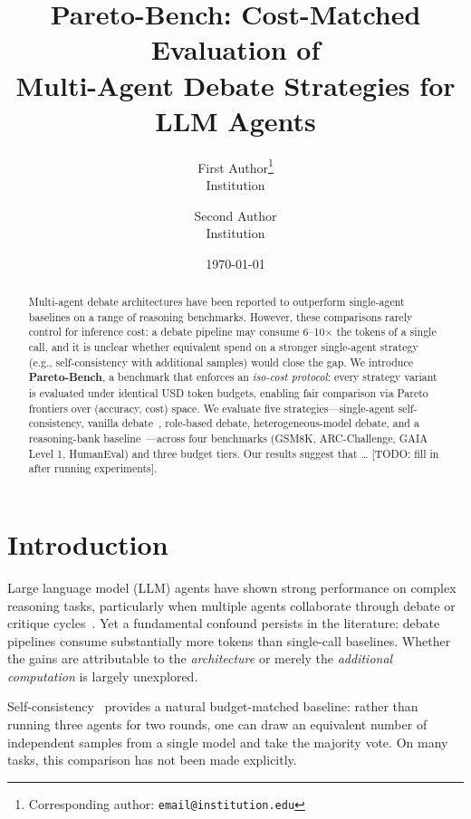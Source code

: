\documentclass[11pt]{article}
\title{\textbf{Pareto-Bench}: Cost-Matched Evaluation of\\
Multi-Agent Debate Strategies for LLM Agents}
\author{
  First Author\thanks{Corresponding author: \texttt{email@institution.edu}} \\
  Institution \\
  \and
  Second Author \\
  Institution
}
\date{\today}
\begin{document}
\maketitle

\begin{abstract}

Multi-agent debate architectures have been reported to outperform single-agent
baselines on a range of reasoning benchmarks.  However, these comparisons
rarely control for inference cost: a debate pipeline may consume 6--10$\times$ the
tokens of a single call, and it is unclear whether equivalent spend on a
stronger single-agent strategy (e.g., self-consistency with additional samples)
would close the gap.  We introduce \textbf{Pareto-Bench}, a benchmark that
enforces an \emph{iso-cost protocol}: every strategy variant is evaluated under
identical USD token budgets, enabling fair comparison via Pareto frontiers over
(accuracy, cost) space.  We evaluate five strategies---single-agent
self-consistency, vanilla debate~\citep{du2024improving}, role-based debate,
heterogeneous-model debate, and a reasoning-bank baseline~\citep{ouyang2025reasoningbank}---across four benchmarks (GSM8K, ARC-Challenge, GAIA Level 1,
HumanEval) and three budget tiers.  Our results suggest that \ldots
[TODO: fill in after running experiments].

\end{abstract}

\section{Introduction}

Large language model (LLM) agents have shown strong performance on complex
reasoning tasks, particularly when multiple agents collaborate through debate
or critique cycles~\citep{du2024improving,cemri2025mast}.  Yet a fundamental
confound persists in the literature: debate pipelines consume substantially more
tokens than single-call baselines.  Whether the gains are attributable to the
\emph{architecture} or merely the \emph{additional computation} is largely
unexplored.

Self-consistency~\citep{wang2023selfconsistency} provides a natural budget-matched
baseline: rather than running three agents for two rounds, one can draw an
equivalent number of independent samples from a single model and take the
majority vote.  On many tasks, this comparison has not been made explicitly.
\end{document}
